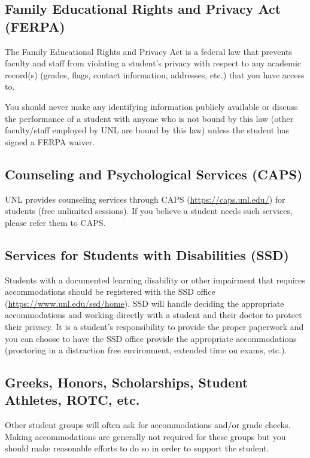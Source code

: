 \documentclass[12pt]{scrartcl}
\begin{document}
\subsection{Family Educational Rights and Privacy Act (FERPA)}

The Family Educational Rights and Privacy Act is a federal law
that prevents faculty and staff from violating a student's privacy
with respect to any academic record(s) (grades, flags, contact
information, addresses, etc.) that you have access to.  

You should never make any identifying information publicly available
or discuss the performance of a student with anyone who is 
not bound by this law (other faculty/staff employed by UNL are
bound by this law) unless the student has signed a FERPA waiver.

\subsection{Counseling and Psychological Services (CAPS)}

UNL provides counseling services through CAPS 
(\url{https://caps.unl.edu/}) for students (free unlimited 
sessions).  If you believe a student needs such services, please
refer them to CAPS.

\subsection{Services for Students with Disabilities (SSD)}

Students with a documented learning disability or other impairment
that requires accommodations should be registered with the 
SSD office (\url{https://www.unl.edu/ssd/home}).  SSD will handle
deciding the appropriate accommodations and working directly
with a student and their doctor to protect their privacy.  
It is a student's responsibility to provide the proper paperwork
and you can choose to have the SSD office provide the appropriate
accommodations (proctoring in a distraction free environment, 
extended time on exams, etc.).

\subsection{Greeks, Honors, Scholarships, Student Athletes, ROTC, etc.}

Other student groups will often ask for accommodations and/or
grade checks.  Making accommodations are generally not required
for these groups but you should make reasonable efforts to do so
in order to support the student.  
\end{document}
